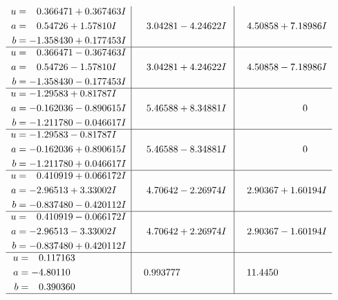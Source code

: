\documentclass[1p]{elsarticle_modified}
\theoremstyle{definition}
\begin{document}
$$\begin{array}{c|c|c}
\begin{aligned}
u &= \phantom{-}0.366471 + 0.367463 I \\
a &= \phantom{-}0.54726 + 1.57810 I \\
b &= -1.358430 + 0.177453 I\end{aligned}
 & \phantom{-}3.04281 - 4.24622 I & \phantom{-}4.50858 + 7.18986 I \\ \hline\begin{aligned}
u &= \phantom{-}0.366471 - 0.367463 I \\
a &= \phantom{-}0.54726 - 1.57810 I \\
b &= -1.358430 - 0.177453 I\end{aligned}
 & \phantom{-}3.04281 + 4.24622 I & \phantom{-}4.50858 - 7.18986 I \\ \hline\begin{aligned}
u &= -1.29583 + 0.81787 I \\
a &= -0.162036 - 0.890615 I \\
b &= -1.211780 - 0.046617 I\end{aligned}
 & \phantom{-}5.46588 + 8.34881 I & \phantom{-0.000000 } 0 \\ \hline\begin{aligned}
u &= -1.29583 - 0.81787 I \\
a &= -0.162036 + 0.890615 I \\
b &= -1.211780 + 0.046617 I\end{aligned}
 & \phantom{-}5.46588 - 8.34881 I & \phantom{-0.000000 } 0 \\ \hline\begin{aligned}
u &= \phantom{-}0.410919 + 0.066172 I \\
a &= -2.96513 + 3.33002 I \\
b &= -0.837480 - 0.420112 I\end{aligned}
 & \phantom{-}4.70642 - 2.26974 I & \phantom{-}2.90367 + 1.60194 I \\ \hline\begin{aligned}
u &= \phantom{-}0.410919 - 0.066172 I \\
a &= -2.96513 - 3.33002 I \\
b &= -0.837480 + 0.420112 I\end{aligned}
 & \phantom{-}4.70642 + 2.26974 I & \phantom{-}2.90367 - 1.60194 I \\ \hline\begin{aligned}
u &= \phantom{-}0.117163\phantom{ +0.000000I} \\
a &= -4.80110\phantom{ +0.000000I} \\
b &= \phantom{-}0.390360\phantom{ +0.000000I}\end{aligned}
 & \phantom{-}0.993777\phantom{ +0.000000I} & \phantom{-}11.4450\phantom{ +0.000000I}\\
 \hline 
 \end{array}$$\newpage\newpage\renewcommand{\arraystretch}{1}
\end{document}
